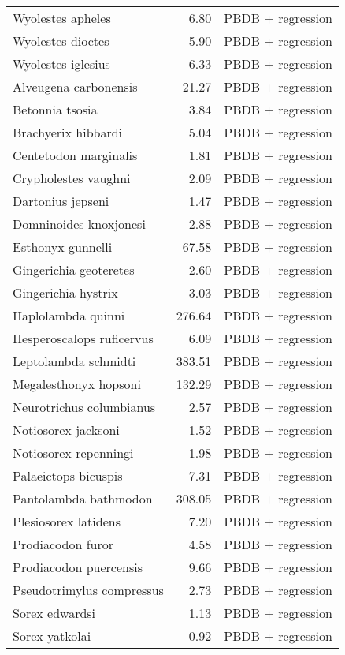 \begin{table}[ht]
\begin{tabular}{lrl}
  Wyolestes apheles & 6.80 & PBDB + regression \\ 
  Wyolestes dioctes & 5.90 & PBDB + regression \\ 
  Wyolestes iglesius & 6.33 & PBDB + regression \\ 
  Alveugena carbonensis & 21.27 & PBDB + regression \\ 
  Betonnia tsosia & 3.84 & PBDB + regression \\ 
  Brachyerix hibbardi & 5.04 & PBDB + regression \\ 
  Centetodon marginalis & 1.81 & PBDB + regression \\ 
  Crypholestes vaughni & 2.09 & PBDB + regression \\ 
  Dartonius jepseni & 1.47 & PBDB + regression \\ 
  Domninoides knoxjonesi & 2.88 & PBDB + regression \\ 
  Esthonyx gunnelli & 67.58 & PBDB + regression \\ 
  Gingerichia geoteretes & 2.60 & PBDB + regression \\ 
  Gingerichia hystrix & 3.03 & PBDB + regression \\ 
  Haplolambda quinni & 276.64 & PBDB + regression \\ 
  Hesperoscalops ruficervus & 6.09 & PBDB + regression \\ 
  Leptolambda schmidti & 383.51 & PBDB + regression \\ 
  Megalesthonyx hopsoni & 132.29 & PBDB + regression \\ 
  Neurotrichus columbianus & 2.57 & PBDB + regression \\ 
  Notiosorex jacksoni & 1.52 & PBDB + regression \\ 
  Notiosorex repenningi & 1.98 & PBDB + regression \\ 
  Palaeictops bicuspis & 7.31 & PBDB + regression \\ 
  Pantolambda bathmodon & 308.05 & PBDB + regression \\ 
  Plesiosorex latidens & 7.20 & PBDB + regression \\ 
  Prodiacodon furor & 4.58 & PBDB + regression \\ 
  Prodiacodon puercensis & 9.66 & PBDB + regression \\ 
  Pseudotrimylus compressus & 2.73 & PBDB + regression \\ 
  Sorex edwardsi & 1.13 & PBDB + regression \\ 
  Sorex yatkolai & 0.92 & PBDB + regression \\ 

\end{tabular}
\end{table}
